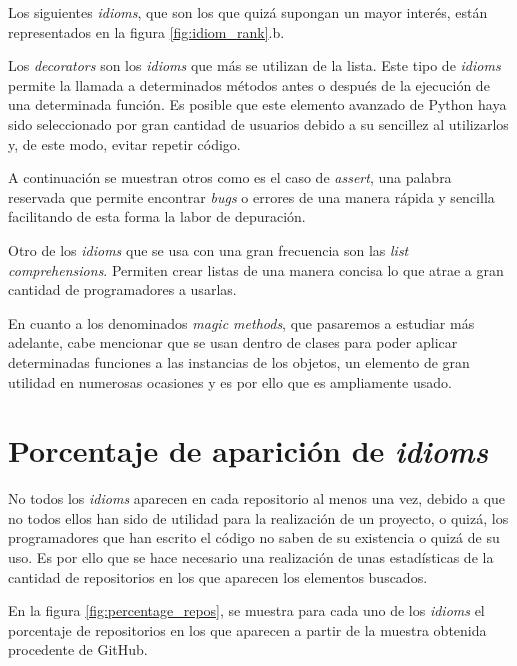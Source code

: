 \documentclass[a4paper, 12pt]{book}
\begin{document}
Los siguientes \textit{idioms}, que son los que quizá supongan un mayor interés, están representados en la figura \ref{fig:idiom_rank}.b.

Los \textit{decorators} son los \textit{idioms} que más se utilizan de la lista. Este tipo de \textit{idioms} permite la llamada a determinados métodos antes o después de la ejecución de una determinada función. Es posible que este elemento avanzado de Python haya sido seleccionado por gran cantidad de usuarios debido a su sencillez al utilizarlos y, de este modo, evitar repetir código.

A continuación se muestran otros como es el caso de \textit{assert}, una palabra reservada que permite encontrar \textit{bugs} o errores de una manera rápida y sencilla facilitando de esta forma la labor de depuración.

Otro de los \textit{idioms} que se usa con una gran frecuencia son las \textit{list comprehensions}. Permiten crear listas de una manera concisa lo que atrae a gran cantidad de programadores a usarlas.

En cuanto a los denominados \textit{magic methods}, que pasaremos a estudiar más adelante, cabe mencionar que se usan dentro de clases para poder aplicar determinadas funciones a las instancias de los objetos, un elemento de gran utilidad en numerosas ocasiones y es por ello que es ampliamente usado.




\section{Porcentaje de aparición de \textit{idioms}}

No todos los \textit{idioms} aparecen en cada repositorio al menos una vez, debido a que no todos ellos han sido de utilidad para la realización de un proyecto, o quizá, los programadores que han escrito el código no saben de su existencia o quizá de su uso. Es por ello que se hace necesario una realización de unas estadísticas de la cantidad de repositorios en los que aparecen los elementos buscados.

En la figura \ref{fig:percentage_repos}, se muestra para cada uno de los \textit{idioms} el porcentaje de repositorios en los que aparecen a partir de la muestra obtenida procedente de GitHub.
\end{document}
